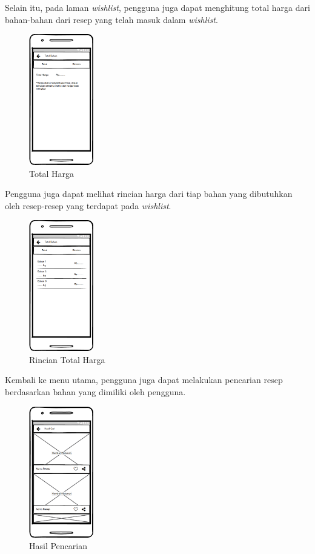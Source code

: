 		Selain itu, pada laman \textit{wishlist}, pengguna juga dapat menghitung total harga dari bahan-bahan dari resep yang telah masuk dalam \textit{wishlist}. 
		\begin{figure}[H]
			\centering
			\includegraphics[width=0.25\textwidth]{gambar/wireframe/TotalHarga}
			\caption{Total Harga}
		\end{figure}
	Pengguna juga dapat melihat rincian harga dari tiap bahan yang dibutuhkan oleh resep-resep yang terdapat pada \textit{wishlist}.
		\begin{figure}[H]
			\centering
			\includegraphics[width=0.25\textwidth]{gambar/wireframe/TotalHargaRincian}
			\caption{Rincian Total Harga}
		\end{figure}
	Kembali ke menu utama, pengguna juga dapat melakukan pencarian resep berdasarkan bahan yang dimiliki oleh pengguna.
		\begin{figure}[H]
			\centering
			\includegraphics[width=0.25\textwidth]{gambar/wireframe/HasilCari}
			\caption{Hasil Pencarian}
		\end{figure}
